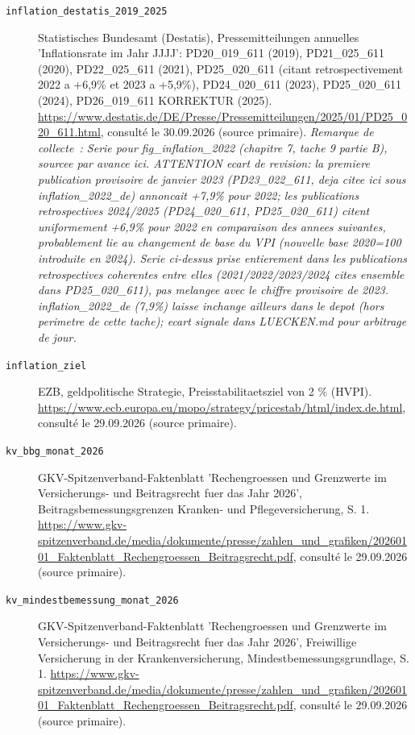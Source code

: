\begin{description}
\item[\texttt{inflation\_destatis\_2019\_2025}] \label{src:inflation_destatis_2019_2025} Statistisches Bundesamt (Destatis), Pressemitteilungen annuelles 'Inflationsrate im Jahr JJJJ': PD20\_019\_611 (2019), PD21\_025\_611 (2020), PD22\_025\_611 (2021), PD25\_020\_611 (citant retrospectivement 2022 a +6,9\% et 2023 a +5,9\%), PD24\_020\_611 (2023), PD25\_020\_611 (2024), PD26\_019\_611 KORREKTUR (2025). \url{https://www.destatis.de/DE/Presse/Pressemitteilungen/2025/01/PD25_020_611.html}, consulté le 30.09.2026 (source primaire). \textit{Remarque de collecte~: Serie pour fig\_inflation\_2022 (chapitre 7, tache 9 partie B), sourcee par avance ici. ATTENTION ecart de revision: la premiere publication provisoire de janvier 2023 (PD23\_022\_611, deja citee ici sous inflation\_2022\_de) annoncait +7,9\% pour 2022; les publications retrospectives 2024/2025 (PD24\_020\_611, PD25\_020\_611) citent uniformement +6,9\% pour 2022 en comparaison des annees suivantes, probablement lie au changement de base du VPI (nouvelle base 2020=100 introduite en 2024). Serie ci-dessus prise entierement dans les publications retrospectives coherentes entre elles (2021/2022/2023/2024 cites ensemble dans PD25\_020\_611), pas melangee avec le chiffre provisoire de 2023. inflation\_2022\_de (7,9\%) laisse inchange ailleurs dans le depot (hors perimetre de cette tache); ecart signale dans LUECKEN.md pour arbitrage de jour.}
\item[\texttt{inflation\_ziel}] \label{src:inflation_ziel} EZB, geldpolitische Strategie, Preisstabilitaetsziel von 2 \% (HVPI). \url{https://www.ecb.europa.eu/mopo/strategy/pricestab/html/index.de.html}, consulté le 29.09.2026 (source primaire).
\item[\texttt{kv\_bbg\_monat\_2026}] \label{src:kv_bbg_monat_2026} GKV-Spitzenverband-Faktenblatt 'Rechengroessen und Grenzwerte im Versicherungs- und Beitragsrecht fuer das Jahr 2026', Beitragsbemessungsgrenzen Kranken- und Pflegeversicherung, S. 1. \url{https://www.gkv-spitzenverband.de/media/dokumente/presse/zahlen_und_grafiken/20260101_Faktenblatt_Rechengroessen_Beitragsrecht.pdf}, consulté le 29.09.2026 (source primaire).
\item[\texttt{kv\_mindestbemessung\_monat\_2026}] \label{src:kv_mindestbemessung_monat_2026} GKV-Spitzenverband-Faktenblatt 'Rechengroessen und Grenzwerte im Versicherungs- und Beitragsrecht fuer das Jahr 2026', Freiwillige Versicherung in der Krankenversicherung, Mindestbemessungsgrundlage, S. 1. \url{https://www.gkv-spitzenverband.de/media/dokumente/presse/zahlen_und_grafiken/20260101_Faktenblatt_Rechengroessen_Beitragsrecht.pdf}, consulté le 29.09.2026 (source primaire).

\end{description}
